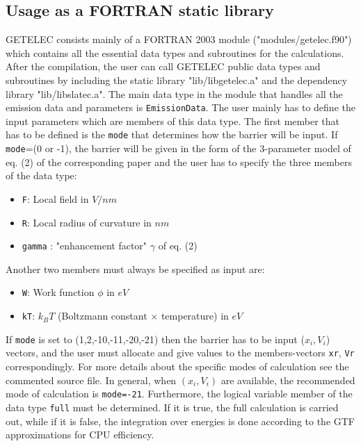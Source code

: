\documentclass[notitlepage]{revtex4-1}
\begin{document}
\subsection{Usage as a FORTRAN static library}   
\label{fortran}
GETELEC consists mainly of a FORTRAN 2003 module ("modules/getelec.f90") which contains all the essential data types and subroutines for the calculations. After the compilation, the user can call GETELEC public data types and subroutines by including the static library "lib/libgetelec.a" and the dependency library "lib/libslatec.a". The main data type in the module that handles all the emission data and parameters is \texttt{EmissionData}. The user mainly has to define the input parameters which are members of this data type. The first member that has to be defined is the \texttt{mode} that determines how the barrier will be input. If \texttt{mode}=(0 or -1), the barrier will be given in the form of the 3-parameter model of eq. (2) of the corresponding paper and the user has to specify the three members of the data type:
\begin{itemize}
	\item \texttt{F}: Local field in $V/nm$
	\item \texttt{R}: Local radius of curvature in $nm$
	\item \texttt{gamma} : "enhancement factor" $\gamma$ of eq. (2) 
\end{itemize} 
Another two members must always be specified as input are:
\begin{itemize}
	\item \texttt{W}: Work function $\phi$ in $eV$
	\item \texttt{kT}: $k_BT$ (Boltzmann constant $\times$ temperature) in $eV$
\end{itemize}
If \texttt{mode} is set to (1,2,-10,-11,-20,-21) then the barrier has to be input ($x_i,V_i$) vectors, and the user must allocate and give values to the members-vectors \texttt{xr}, \texttt{Vr} correspondingly. For more details about the specific modes of calculation see the commented source file. In general, when $(x_i,V_i)$ are available, the recommended mode of calculation is \texttt{mode=-21}. Furthermore, the logical variable member of the data type \texttt{full} must be determined. If it is true, the full calculation is carried out, while if it is false, the integration over energies is done according to the GTF approximations for CPU efficiency.
\end{document}
